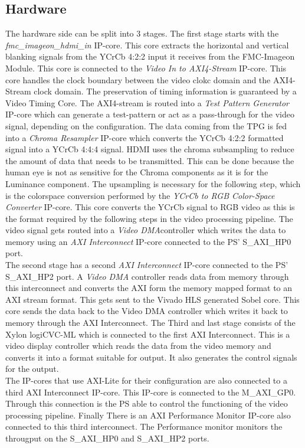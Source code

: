 \subsection{Hardware}
The hardware side can be split into 3 stages. The first stage starts with the \emph{fmc\_imageon\_hdmi\_in} IP-core. This core extracts the horizontal and vertical blanking signals from the YCrCb 4:2:2 input it receives from the FMC-Imageon Module. This core is connected to the \emph{Video In to AXI4-Stream} IP-core. This core handles the clock boundary between the video clokc domain and the AXI4-Stream clock domain. The preservation of timing information is guaranteed by a Video Timing Core. The AXI4-stream is routed into a \emph{Test Pattern Generator} IP-core which can generate a test-pattern or act as a pass-through for the video signal, depending on the configuration. The data coming from the TPG is fed into a \emph{Chroma Resampler} IP-core which converts the YCrCb 4:2:2 formatted signal into a YCrCb 4:4:4 signal. HDMI uses the chroma subsampling to reduce the amount of data that needs to be transmitted. This can be done because the human eye is not as sensitive for the Chroma components as it is for the Luminance component. The upsampling is necessary for the following step, which is the colorspace conversion performed by the \emph{YCrCb to RGB Color-Space Converter} IP-core. This core converts the YCrCb signal to RGB video as this is the format required by the following steps in the video processing pipeline. The video signal gets routed into a \emph{Video DMA}controller which writes the data to memory using an \emph{AXI Interconnect} IP-core connected to the PS' S\_AXI\_HP0 port.\\
The second stage has a second \emph{AXI Interconnect} IP-core connected to the PS' S\_AXI\_HP2 port. A \emph{Video DMA} controller reads data from memory through this interconnect and converts the AXI form the memory mapped format to an AXI stream format. This gets sent to the Vivado HLS generated Sobel core. This core sends the data back to the Video DMA controller which writes it back to memory through the AXI Interconnect.
The Third and last stage consists of the Xylon logiCVC-ML which is connected to the first AXI Interconnect. This is a video display controller which reads the data from the video memory and converts it into a format suitable for output. It also generates the control signals for the output.\\
The IP-cores that use AXI-Lite for their configuration are also connected to a third AXI Interconnect IP-core. This IP-core is connected to the M\_AXI\_GP0. Through this connection is the PS able to control the functioning of the video processing pipeline. Finally There is an AXI Performance Monitor IP-core also connected to this third interconnect. The Performance monitor monitors the througput on the S\_AXI\_HP0 and S\_AXI\_HP2 ports. 






